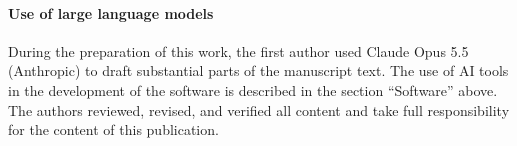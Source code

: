 \documentclass[smallextended]{svjour3}
\numberwithin{equation}{section}
\begin{document}
\paragraph{Use of large language models}
During the preparation of this work, the first author used Claude Opus 5.5 (Anthropic) to draft substantial parts of the manuscript text. The use of AI tools in the development of the software is described in the section ``Software'' above. The authors reviewed, revised, and verified all content and take full responsibility for the content of this publication.

\renewcommand{\bibfont}{\small}
\setlength{\bibsep}{0pt plus 0.3ex}


\end{document}

